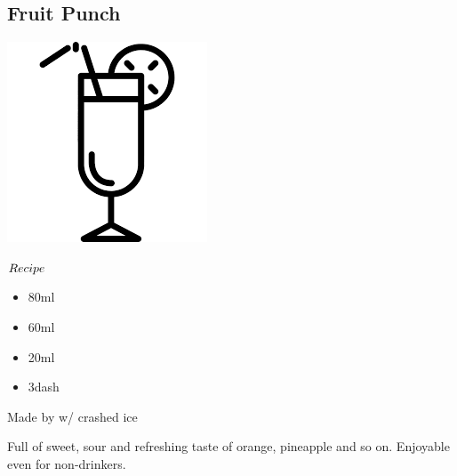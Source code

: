 \subsection{Fruit Punch}
\vspace{-7.4mm}
\hspace{36mm}
\includegraphics[scale=.07]{cocktail_glass_tall.png}
\vspace{2.5mm}
\begin{itembox}[l]{\boldmath $Recipe$}
\begin{itemize}
\setlength{\parskip}{0cm}
\setlength{\itemsep}{0cm}
\item \oj 80ml
\item \pj 60ml
\item \lj 20ml
\item \gs 3dash
\end{itemize}
\vspace{-4mm}
Made by \build w/ crashed ice
\end{itembox}
Full of sweet, sour and refreshing taste of orange, pineapple and so on.
Enjoyable even for non-drinkers.
